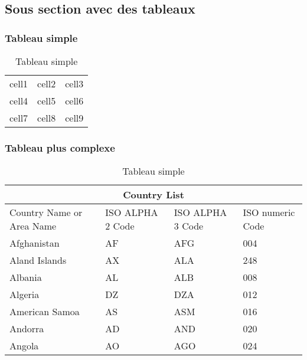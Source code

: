 \subsection{Sous section avec des tableaux}%
\label{sec:subsectiontableau}

\subsubsection{Tableau simple}

\begin{table}[h!]
    \centering
    \begin{tabular}{ |c|c|c| } 
        \hline
        cell1 & cell2 & cell3 \\ 
        cell4 & cell5 & cell6 \\ 
        cell7 & cell8 & cell9 \\ 
        \hline
    \end{tabular}
    \caption{Tableau simple}%
    \label{table:tableausimple}
\end{table}


\subsubsection{Tableau plus complexe}

\begin{table}[h!]
    \begin{tabular}{ |p{3cm}||p{3cm}|p{3cm}|p{3cm}|  }
        \hline
        \multicolumn{4}{|c|}{Country List} \\
        \hline
        Country Name     or Area Name& ISO ALPHA 2 Code &ISO ALPHA 3 Code&ISO numeric Code\\
        \hline
        Afghanistan   & AF    &AFG&   004\\
        Aland Islands&   AX  & ALA   &248\\
        Albania &AL & ALB&  008\\
        Algeria    &DZ & DZA&  012\\
        American Samoa&   AS  & ASM&016\\
        Andorra& AD  & AND   &020\\
        Angola& AO  & AGO&024\\
        \hline
    \end{tabular}
    \caption{Tableau simple}%
    \label{table:tableaucomplexe}
\end{table}


